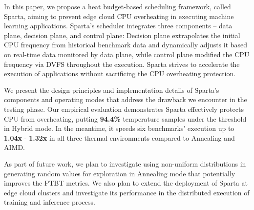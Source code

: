 In this paper, we propose a heat budget-based scheduling framework, called Sparta, aiming to prevent edge cloud CPU overheating in executing machine learning applications. Sparta's scheduler integrates three components -- data plane, decision plane, and control plane: Decision plane extrapolates the initial CPU frequency from historical benchmark data and dynamically adjusts it based on real-time data monitored by data plane, while control plane modified the CPU frequency via DVFS throughout the execution. Sparta strives to accelerate the execution of applications without sacrificing the CPU overheating protection.  

We present the design principles and implementation details of Sparta's components and operating modes that address the drawback we encounter in the testing phase. Our empirical evaluation demonstrates Sparta effectively protects CPU from overheating, putting \textbf{94.4\%} temperature samples under the threshold in Hybrid mode. In the meantime, it speeds six benchmarks' execution up to \textbf{1.04x} - \textbf{1.32x} in all three thermal environments compared to Annealing and AIMD.

As part of future work, we plan to investigate using non-uniform distributions in generating random values for exploration in Annealing mode that potentially improves the PTBT metrics. We also plan to extend the deployment of Sparta at edge cloud clusters and investigate its performance in the distributed execution of training and inference process. 